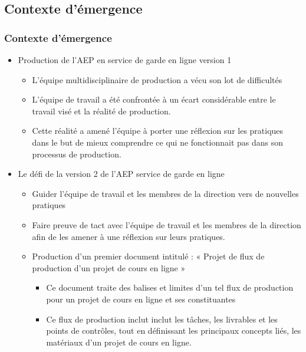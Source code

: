                \subsection{Contexte d'émergence} 
		\begin{frame}[allowframebreaks]
			\frametitle{Contexte d'émergence}
			\begin{itemize}
				\item Production de l'AEP en service de garde en ligne version 1
                                  \begin{itemize}
                                    \item L’équipe multidisciplinaire de production a vécu son lot de difficultés
                                    \item L’équipe de travail a été confrontée à un écart considérable entre le travail visé et la réalité de production.
                                    \item Cette réalité a amené l’équipe à porter une réflexion sur les pratiques dans le but de mieux comprendre ce qui ne fonctionnait pas dans son processus de production.
                                  \end{itemize}
                                \framebreak
                                \item Le défi de la version 2 de l'AEP service de garde en ligne
                                  \begin{itemize}
                                  \item Guider l’équipe de travail et les membres de la direction vers de nouvelles pratiques
                                  \item Faire preuve de tact avec l’équipe de travail et les membres de la direction afin de les amener à une réflexion sur leurs pratiques. 
                                  \item Production d'un premier document intitulé : « Projet de flux de production d’un projet de cours en ligne » 
                                    \begin{itemize}
                                      \item Ce document traite des balises et limites d’un tel flux de production pour un projet de cours en ligne et ses constituantes
                                      \item Ce flux de production inclut inclut les tâches, les livrables et les points de contrôles, tout en définissant les principaux concepts liés, les matériaux d’un projet de cours en ligne.
                                         
                                    \end{itemize} 
                                  \end{itemize}                                             
                                \end{itemize} 
                        \end{frame}

